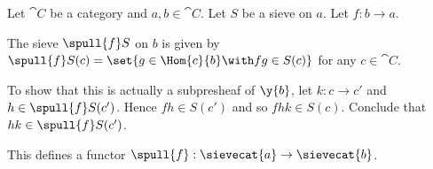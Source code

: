 \begin{definition}
Let $\cat{C}$ be a category
and $a,b \in \cat{C}$.
Let $S$ be a sieve on $a$.
Let $f:b \rightarrow a$.

The sieve $\spull{f}S$
on $b$ is given by
$\spull{f}S(c) = \set{g \in \Hom{c}{b} \with fg \in S(c)}$
for any $c \in \cat{C}$.

To show that this is actually a subpresheaf of $\y{b}$,
let $k: c \rightarrow c'$ 
and $h \in \spull{f}S(c')$. 
Hence $fh \in S(c')$ and so $fhk \in S(c)$.
Conclude that $hk \in \spull{f}S(c')$.

This defines a functor $\spull{f}: \sievecat{a} \rightarrow \sievecat{b}$.
\end{definition}